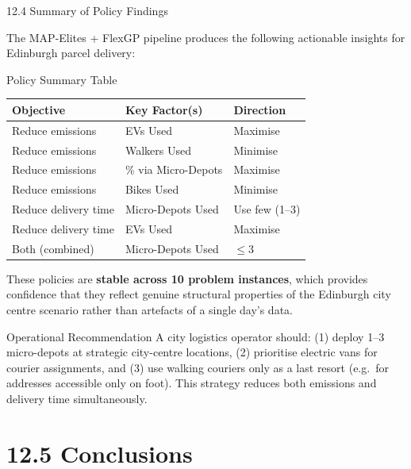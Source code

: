 \documentclass[aspectratio=169,10pt]{beamer}
\begin{document}
\begin{frame}[allowframebreaks]{12.4 Summary of Policy Findings}

The MAP-Elites + FlexGP pipeline produces the following
actionable insights for Edinburgh parcel delivery:

\medskip

\begin{block}{Policy Summary Table}
  \begin{tabular}{lll}
    \toprule
    \textbf{Objective} & \textbf{Key Factor(s)} & \textbf{Direction} \\
    \midrule
    Reduce emissions & EVs Used & Maximise \\
    Reduce emissions & Walkers Used & Minimise \\
    Reduce emissions & \% via Micro-Depots & Maximise \\
    Reduce emissions & Bikes Used & Minimise \\
    Reduce delivery time & Micro-Depots Used & Use few (1--3) \\
    Reduce delivery time & EVs Used & Maximise \\
    Both (combined) & Micro-Depots Used & $\le 3$ \\
    \bottomrule
  \end{tabular}
\end{block}

\medskip

These policies are \textbf{stable across 10 problem instances},
which provides confidence that they reflect genuine structural
properties of the Edinburgh city centre scenario
rather than artefacts of a single day's data.

\medskip

\begin{alertblock}{Operational Recommendation}
  A city logistics operator should: (1) deploy 1--3 micro-depots
  at strategic city-centre locations, (2) prioritise electric vans
  for courier assignments, and (3) use walking couriers only as a
  last resort (e.g.\ for addresses accessible only on foot).
  This strategy reduces both emissions and delivery time simultaneously.
\end{alertblock}

\end{frame}

\section{12.5 Conclusions}
\end{document}
